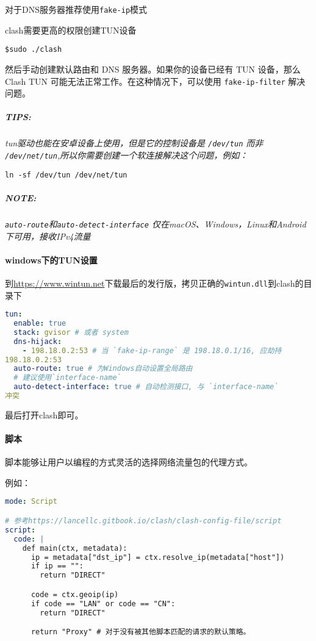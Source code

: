 对于DNS服务器推荐使用\verb|fake-ip|模式


clash需要更高的权限创建TUN设备


\verb|$sudo ./clash|


然后手动创建默认路由和 DNS 服务器。如果你的设备已经有 TUN 设备，那么 Clash TUN 可能无法正常工作。在这种情况下，可以使用 \verb|fake-ip-filter| 解决问题。

\subparagraph{TIPS:} {\em tun驱动也能在安卓设备上使用，但是它的控制设备是 \verb|/dev/tun| 而非 \verb|/dev/net/tun|,所以你需要创建一个软连接解决这个问题，例如：

\verb|ln -sf /dev/tun /dev/net/tun|}
\subparagraph{NOTE:}{\em \verb|auto-route|和\verb|auto-detect-interface| 仅在macOS、Windows，Linux和Android下可用，接收IPv4流量}

\paragraph{windows下的TUN设置}到\url{https://www.wintun.net}下载最后的发行版，拷贝正确的\verb|wintun.dll|到clash的目录下\\

\begin{lstlisting}[breaklines=true,language=yaml,style=yaml]
tun:
  enable: true
  stack: gvisor # 或者 system
  dns-hijack:
    - 198.18.0.2:53 # 当 `fake-ip-range` 是 198.18.0.1/16, 应劫持
198.18.0.2:53
  auto-route: true # 为Windows自动设置全局路由
  # 建议使用`interface-name`
  auto-detect-interface: true # 自动检测接口, 与 `interface-name` 
冲突
\end{lstlisting}



最后打开clash即可。
\paragraph{脚本} 脚本能够让用户以编程的方式灵活的选择网络流量包的代理方式。


例如：\\

\begin{lstlisting}[breaklines=true,language=yaml,style=yaml]
mode: Script

# 参考https://lancellc.gitbook.io/clash/clash-config-file/script
script:
  code: |
    def main(ctx, metadata):
      ip = metadata["dst_ip"] = ctx.resolve_ip(metadata["host"])
      if ip == "":
        return "DIRECT"

      code = ctx.geoip(ip)
      if code == "LAN" or code == "CN":
        return "DIRECT"

      return "Proxy" # 对于没有被其他脚本匹配的请求的默认策略。
\end{lstlisting}

